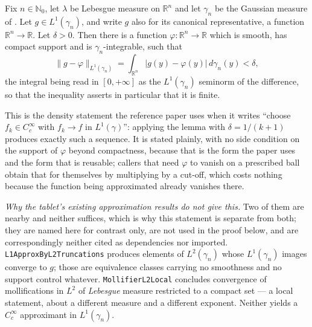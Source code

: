 \begin{lemma}
Fix $n \in \mathbb{N}_0$, let $\lambda$ be Lebesgue measure on $\mathbb{R}^n$ and
let $\gamma_n$ be the Gaussian measure of .  Let
$g \in L^1(\gamma_n)$, and write $g$ also for its canonical representative, a
function $\mathbb{R}^n \to \mathbb{R}$.  Let $\delta > 0$.  Then there is a
function $\varphi : \mathbb{R}^n \to \mathbb{R}$ which is smooth, has compact
support and is $\gamma_n$-integrable, such that
\[
  \|g - \varphi\|_{L^1(\gamma_n)}
    = \int_{\mathbb{R}^n}|g(y) - \varphi(y)|\,d\gamma_n(y) < \delta ,
\]
the integral being read in $[0,+\infty]$ as the $L^1(\gamma_n)$ seminorm of the
difference, so that the inequality asserts in particular that it is finite.

This is the density statement the reference paper uses when it writes ``choose
$f_k \in C_c^\infty$ with $f_k \to f$ in $L^1(\gamma)$'': applying the lemma
with $\delta = 1/(k+1)$ produces exactly such a sequence.  It is stated plainly,
with no side condition on the support of $\varphi$ beyond compactness, because
that is the form the paper uses and the form that is reusable; callers that need
$\varphi$ to vanish on a prescribed ball obtain that for themselves by
multiplying by a cut-off, which costs nothing because the function being
approximated already vanishes there.

\emph{Why the tablet's existing approximation results do not give this.}  Two
of them are nearby and neither suffices, which is why this statement is
separate from both; they are named here for contrast only, are not used in the
proof below, and are correspondingly neither cited as dependencies nor
imported.  \texttt{L1ApproxByL2Truncations} produces elements of
$L^2(\gamma_n)$ whose $L^1(\gamma_n)$ images converge to $g$; those are
equivalence classes carrying no smoothness and no support control whatever.
\texttt{MollifierL2Local} concludes convergence of mollifications in $L^2$ of
\emph{Lebesgue} measure restricted to a compact set --- a local statement, about
a different measure and a different exponent.  Neither yields a $C_c^\infty$
approximant in $L^1(\gamma_n)$.
\end{lemma}
